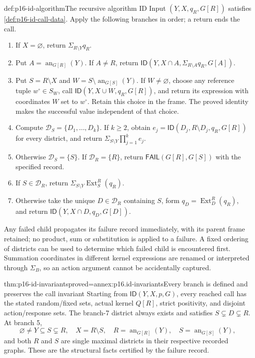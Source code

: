 \begin{hbmethod}{def:p16-id-algorithm}{The recursive algorithm ID}
Input \((Y,X,q_R,G[R])\) satisfies \cref{def:p16-id-call-data}.
Apply the following branches in order; a return ends the call.
\begin{enumerate}
\item If \(X=\varnothing\), return \(\Sigma_{R\setminus Y}q_R\).
\item Put \(A=\operatorname{an}_{G[R]}(Y)\). If \(A\ne R\),
      return \(\mathsf{ID}(Y,X\cap A,
                  \Sigma_{R\setminus A}q_R,G[A])\).
\item Put \(S=R\setminus X\) and
      \(W=S\setminus\operatorname{an}_{G[S]}(Y)\).
      If \(W\ne\varnothing\), choose any reference tuple
      \(w^\circ\in S_W\), call
      \(\mathsf{ID}(Y,X\cup W,q_R,G[R])\), and return its
      expression with coordinates \(W\) set to \(w^\circ\).
      Retain this choice in the frame. The proved identity makes
      the successful value independent of that choice.
\item Compute \(\mathcal D_S=\{D_1,\ldots,D_k\}\).
      If \(k\geq2\), obtain
      \(e_j=\mathsf{ID}(D_j,R\setminus D_j,q_R,G[R])\)
      for every district, and return
      \(\Sigma_{S\setminus Y}\prod_{j=1}^k e_j\).
\item Otherwise \(\mathcal D_S=\{S\}\). If
      \(\mathcal D_R=\{R\}\), return
      \(\mathsf{FAIL}(G[R],G[S])\) with the specified record.
\item If \(S\in\mathcal D_R\), return
      \(\Sigma_{S\setminus Y}\operatorname{Ext}^R_S(q_R)\).
\item Otherwise take the unique \(D\in\mathcal D_R\) containing
      \(S\), form \(q_D=\operatorname{Ext}^R_D(q_R)\), and
      return \(\mathsf{ID}(Y,X\cap D,q_D,G[D])\).
\end{enumerate}
Any failed child propagates its failure record immediately, with its
parent frame retained; no product, sum or substitution is applied to
a failure. A fixed ordering of districts can be used to determine
which failed child is encountered first. Summation coordinates in
different kernel expressions are renamed or interpreted through
\(\Sigma_B\), so an action argument cannot be accidentally captured.
\end{hbmethod}

\begin{hbtheorem}{thm:p16-id-invariants}{proved=annex:p16.id-invariants}{Every branch is defined and preserves the call invariant}
Starting from \(\mathsf{ID}(Y,X,p,G)\), every reached call
has the stated random/fixed sets, actual kernel \(Q[R]\),
strict positivity, and disjoint action/response sets. The branch-7
district always exists and satisfies \(S\subsetneq D\subsetneq R\).
At branch 5,
\[
 \varnothing\ne Y\subseteq S\subsetneq R,\quad X=R\setminus S,
 \quad R=\operatorname{an}_{G[R]}(Y),\quad
 S=\operatorname{an}_{G[S]}(Y),
\]
and both \(R\) and \(S\) are single maximal districts in
their respective recorded graphs. These are the structural facts
certified by the failure record.
\end{hbtheorem}

